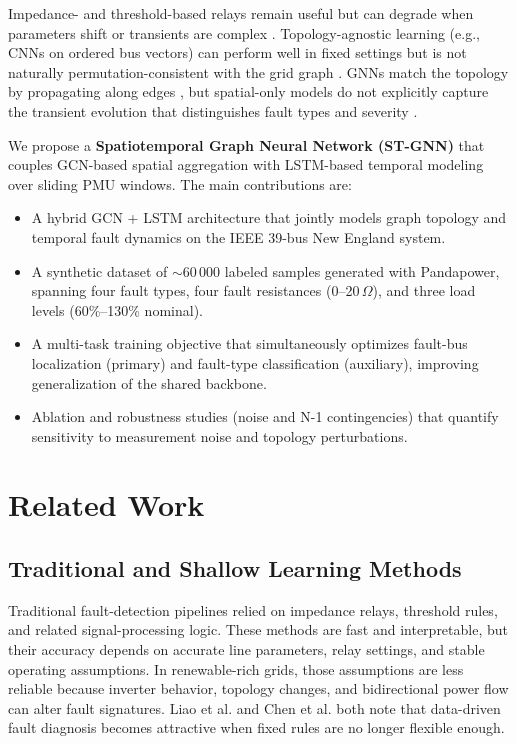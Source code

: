 \documentclass[conference]{IEEEtran}
\begin{document}
Impedance- and threshold-based relays remain useful but can degrade when parameters
shift or transients are complex \cite{chen2020}. Topology-agnostic learning (e.g., CNNs on
ordered bus vectors) can perform well in fixed settings but is not naturally
permutation-consistent with the grid graph \cite{owerko2020}. GNNs match the topology by
propagating along edges \cite{kipf2017}, but spatial-only models do not explicitly capture
the transient evolution that distinguishes fault types and severity \cite{yu2018}.

We propose a \textbf{Spatiotemporal Graph Neural Network (ST-GNN)} that couples GCN-based
spatial aggregation with LSTM-based temporal modeling over sliding PMU windows. The
main contributions are:

\begin{itemize}
  \item A hybrid GCN + LSTM architecture that jointly models graph topology and
        temporal fault dynamics on the IEEE 39-bus New England system.
  \item A synthetic dataset of $\sim$60\,000 labeled samples generated with
        Pandapower, spanning four fault types, four fault resistances (0–20\,$\Omega$),
        and three load levels (60\%–130\% nominal).
  \item A multi-task training objective that simultaneously optimizes fault-bus
        localization (primary) and fault-type classification (auxiliary), improving
        generalization of the shared backbone.
  \item Ablation and robustness studies (noise and N-1 contingencies) that quantify
    sensitivity to measurement noise and topology perturbations.
\end{itemize}

\section{Related Work}
\label{sec:related}

\subsection{Traditional and Shallow Learning Methods}
Traditional fault-detection pipelines relied on impedance relays, threshold rules, and
related signal-processing logic. These methods are fast and interpretable, but their
accuracy depends on accurate line parameters, relay settings, and stable operating
assumptions. In renewable-rich grids, those assumptions are less reliable because inverter
behavior, topology changes, and bidirectional power flow can alter fault signatures. Liao
et al. \cite{liao2021} and Chen et al. \cite{chen2020} both note that data-driven fault
diagnosis becomes attractive when fixed rules are no longer flexible enough.
\end{document}
